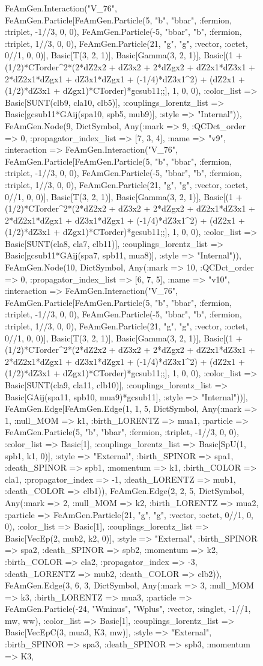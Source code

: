 \documentclass{revtex4}
\begin{document}
\begin{figure}[!htb]
\begin{center}
{FeAmGen.Interaction("V_76", FeAmGen.Particle[FeAmGen.Particle(5, "b", "bbar", :fermion, :triplet, -1//3, 0, 0), FeAmGen.Particle(-5, "bbar", "b", :fermion, :triplet, 1//3, 0, 0), FeAmGen.Particle(21, "g", "g", :vector, :octet, 0//1, 0, 0)], Basic[T(3, 2, 1)], Basic[Gamma(3, 2, 1)], Basic[(1 + (1/2)*CTorder^2*(2*dZ2x2 + dZ3x2 + 2*dZgx2 + dZ2x1*dZ3x1 + 2*dZ2x1*dZgx1 + dZ3x1*dZgx1 + (-1/4)*dZ3x1^2) + (dZ2x1 + (1/2)*dZ3x1 + dZgx1)*CTorder)*gcsub11;;], 1, 0, 0), :color_list => Basic[SUNT(clb9, cla10, clb5)], :couplings_lorentz_list => Basic[gcsub11*GAij(spa10, spb5, mub9)], :style => "Internal")), FeAmGen.Node(9, Dict{Symbol, Any}(:mark => 9, :QCDct_order => 0, :propagator_index_list => [7, 3, 4], :name => "v9", :interaction => FeAmGen.Interaction("V_76", FeAmGen.Particle[FeAmGen.Particle(5, "b", "bbar", :fermion, :triplet, -1//3, 0, 0), FeAmGen.Particle(-5, "bbar", "b", :fermion, :triplet, 1//3, 0, 0), FeAmGen.Particle(21, "g", "g", :vector, :octet, 0//1, 0, 0)], Basic[T(3, 2, 1)], Basic[Gamma(3, 2, 1)], Basic[(1 + (1/2)*CTorder^2*(2*dZ2x2 + dZ3x2 + 2*dZgx2 + dZ2x1*dZ3x1 + 2*dZ2x1*dZgx1 + dZ3x1*dZgx1 + (-1/4)*dZ3x1^2) + (dZ2x1 + (1/2)*dZ3x1 + dZgx1)*CTorder)*gcsub11;;], 1, 0, 0), :color_list => Basic[SUNT(cla8, cla7, clb11)], :couplings_lorentz_list => Basic[gcsub11*GAij(spa7, spb11, mua8)], :style => "Internal")), FeAmGen.Node(10, Dict{Symbol, Any}(:mark => 10, :QCDct_order => 0, :propagator_index_list => [6, 7, 5], :name => "v10", :interaction => FeAmGen.Interaction("V_76", FeAmGen.Particle[FeAmGen.Particle(5, "b", "bbar", :fermion, :triplet, -1//3, 0, 0), FeAmGen.Particle(-5, "bbar", "b", :fermion, :triplet, 1//3, 0, 0), FeAmGen.Particle(21, "g", "g", :vector, :octet, 0//1, 0, 0)], Basic[T(3, 2, 1)], Basic[Gamma(3, 2, 1)], Basic[(1 + (1/2)*CTorder^2*(2*dZ2x2 + dZ3x2 + 2*dZgx2 + dZ2x1*dZ3x1 + 2*dZ2x1*dZgx1 + dZ3x1*dZgx1 + (-1/4)*dZ3x1^2) + (dZ2x1 + (1/2)*dZ3x1 + dZgx1)*CTorder)*gcsub11;;], 1, 0, 0), :color_list => Basic[SUNT(cla9, cla11, clb10)], :couplings_lorentz_list => Basic[GAij(spa11, spb10, mua9)*gcsub11], :style => "Internal"))], FeAmGen.Edge[FeAmGen.Edge(1, 1, 5, Dict{Symbol, Any}(:mark => 1, :null_MOM => k1, :birth_LORENTZ => mua1, :particle => FeAmGen.Particle(5, "b", "bbar", :fermion, :triplet, -1//3, 0, 0), :color_list => Basic[1], :couplings_lorentz_list => Basic[SpU(1, spb1, k1, 0)], :style => "External", :birth_SPINOR => spa1, :death_SPINOR => spb1, :momentum => k1, :birth_COLOR => cla1, :propagator_index => -1, :death_LORENTZ => mub1, :death_COLOR => clb1)), FeAmGen.Edge(2, 2, 5, Dict{Symbol, Any}(:mark => 2, :null_MOM => k2, :birth_LORENTZ => mua2, :particle => FeAmGen.Particle(21, "g", "g", :vector, :octet, 0//1, 0, 0), :color_list => Basic[1], :couplings_lorentz_list => Basic[VecEp(2, mub2, k2, 0)], :style => "External", :birth_SPINOR => spa2, :death_SPINOR => spb2, :momentum => k2, :birth_COLOR => cla2, :propagator_index => -3, :death_LORENTZ => mub2, :death_COLOR => clb2)), FeAmGen.Edge(3, 6, 3, Dict{Symbol, Any}(:mark => 3, :null_MOM => k3, :birth_LORENTZ => mua3, :particle => FeAmGen.Particle(-24, "Wminus", "Wplus", :vector, :singlet, -1//1, mw, ww), :color_list => Basic[1], :couplings_lorentz_list => Basic[VecEpC(3, mua3, K3, mw)], :style => "External", :birth_SPINOR => spa3, :death_SPINOR => spb3, :momentum => K3, }
\end{center}
\end{figure}
\end{document}

